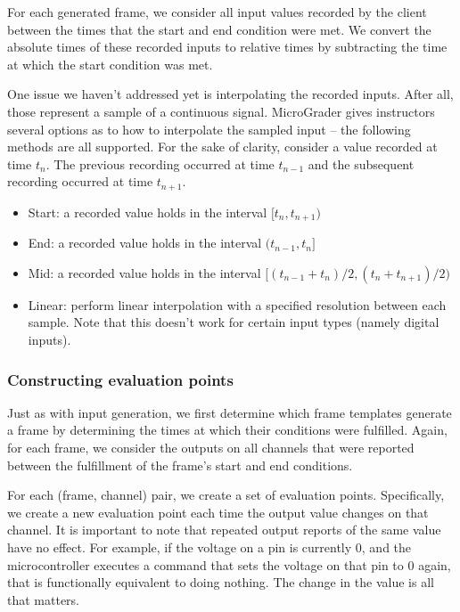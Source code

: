 \documentclass[12pt]{article}
\begin{document}
For each generated frame, we consider all input values recorded by the client between the times that the start and end condition were met.  We convert the absolute times of these recorded inputs to relative times by subtracting the time at which the start condition was met.

One issue we haven't addressed yet is interpolating the recorded inputs.  After all, those represent a sample of a continuous signal.  MicroGrader gives instructors several options as to how to interpolate the sampled input -- the following methods are all supported.  For the sake of clarity, consider a value recorded at time $t_n$.  The previous recording occurred at time $t_{n-1}$ and the subsequent recording occurred at time $t_{n+1}$.

\begin{itemize}
\item Start: a recorded value holds in the interval $[t_n, t_{n+1})$
\item End: a recorded value holds in the interval $(t_{n-1}, t_n]$
\item Mid: a recorded value holds in the interval $[(t_{n-1} + t_n)/2, (t_n + t_{n+1})/2)$
\item Linear: perform linear interpolation with a specified resolution between each sample.  Note that this doesn't work for certain input types (namely digital inputs).
\end{itemize}

\subsubsection{Constructing evaluation points}
\label{sec:using-point-templates}
Just as with input generation, we first determine which frame templates generate a frame by determining the times at which their conditions were fulfilled.  Again, for each frame, we consider the outputs on all channels that were reported between the fulfillment of the frame's start and end conditions.

For each (frame, channel) pair, we create a set of evaluation points.  Specifically, we create a new evaluation point each time the output value changes on that channel.  It is important to note that repeated output reports of the same value have no effect.  For example, if the voltage on a pin is currently 0, and the microcontroller executes a command that sets the voltage on that pin to 0 again, that is functionally equivalent to doing nothing.  The change in the value is all that matters.
\end{document}

